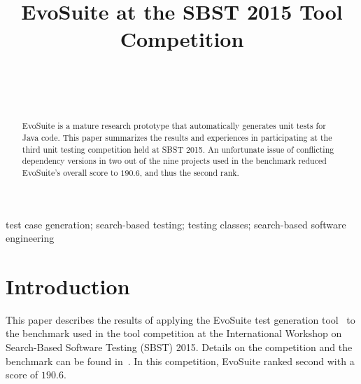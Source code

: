 \documentclass[10pt,conference,compsocconf]{IEEEtran}
\newcommand{\EVOSUITE}{{\sc EvoSuite}\xspace}
\begin{document}
\title{EvoSuite at the SBST 2015 Tool Competition}

\author{
\\
\and
{}
\\
}

\maketitle

\begin{abstract}
  \EVOSUITE is a mature research prototype that automatically
  generates unit tests for Java code.  This paper summarizes the
  results and experiences in participating at the third unit testing
  competition held at SBST 2015. An unfortunate issue of conflicting
  dependency versions in two out of the nine projects used in the
  benchmark reduced \EVOSUITE's overall score to $190.6$, and thus the
  second rank.
\end{abstract}

\begin{IEEEkeywords}
  test case generation; search-based testing; testing classes;
  search-based software engineering
\end{IEEEkeywords}


\section{Introduction}

This paper describes the results of applying the \EVOSUITE test
generation tool~\cite{FrA11c} to the benchmark used in the tool
competition at the International Workshop on Search-Based Software
Testing (SBST) 2015.  Details on the competition and the benchmark can
be found in~\cite{sbst2015}. In this competition, \EVOSUITE ranked
second with a score of $190.6$.
\end{document}
